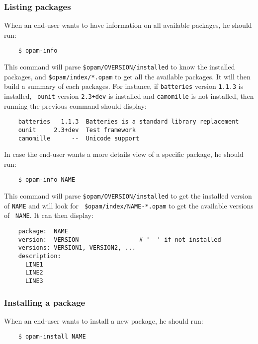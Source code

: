 \documentclass[a4paper,11pt]{article}
\begin{document}
\subsubsection{Listing packages}

When an end-user wants to have information on all available packages,
he should run:

\begin{verbatim}
    $ opam-info
\end{verbatim}

This command will parse {\tt \$opam/OVERSION/installed} to know the
installed packages, and {\tt \$opam/index/*.opam} to get all the
available packages. It will then build a summary of each packages. For
instance, if {\tt batteries} version {\tt 1.1.3} is installed, {\tt
  ounit} version {\tt 2.3+dev} is installed and {\tt camomille} is not
installed, then running the previous command should display:

\begin{verbatim}
    batteries   1.1.3  Batteries is a standard library replacement
    ounit     2.3+dev  Test framework
    camomille      --  Unicode support
\end{verbatim}


In case the end-user wants a more details view of a specific package,
he should run:

\begin{verbatim}
    $ opam-info NAME
\end{verbatim}

This command will parse {\tt \$opam/OVERSION/installed} to get the
installed version of {\tt NAME} and will look for {\tt
  \$opam/index/NAME-*.opam} to get the available versions of {\tt
  NAME}. It can then display:

\begin{verbatim}
    package:  NAME
    version:  VERSION                 # '--' if not installed
    versions: VERSION1, VERSION2, ...
    description:
      LINE1
      LINE2
      LINE3
\end{verbatim}

\subsubsection{Installing a package}
\label{install}

When an end-user wants to install a new package, he should run:

\begin{verbatim}
    $ opam-install NAME
\end{verbatim}
\end{document}
